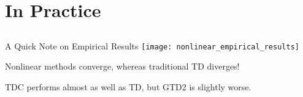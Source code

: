 \documentclass[11pt]{beamer}
\begin{document}
\section{In Practice}
\subsection{}

\begin{frame}{A Quick Note on Empirical Results}
	\texttt{[image: nonlinear\_empirical\_results]}
	
	\pause
	\vspace{2em}
	
	Nonlinear methods converge, whereas traditional TD diverges!
	
	TDC performs almost as well as TD, but GTD2 is slightly worse.
\end{frame}
\end{document}
